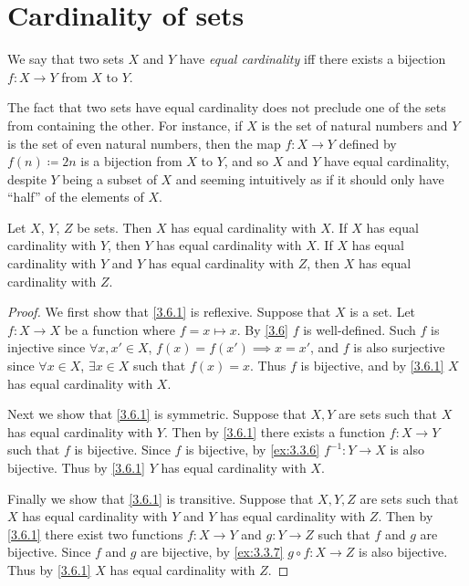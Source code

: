 \section{Cardinality of sets}\label{sec:3.6}

\begin{defn}\label{3.6.1}
  We say that two sets \(X\) and \(Y\) have \emph{equal cardinality} iff there exists a bijection \(f : X \to Y\) from \(X\) to \(Y\).
\end{defn}

\setcounter{thm}{2}
\begin{rmk}\label{3.6.3}
  The fact that two sets have equal cardinality does not preclude one of the sets from containing the other.
  For instance, if \(X\) is the set of natural numbers and \(Y\) is the set of even natural numbers, then the map \(f : X \to Y\) defined by \(f(n) \coloneqq 2n\) is a bijection from \(X\) to \(Y\), and so \(X\) and \(Y\) have equal cardinality, despite \(Y\) being a subset of \(X\) and seeming intuitively as if it should only have ``half'' of the elements of \(X\).
\end{rmk}

\begin{prop}\label{3.6.4}
  Let \(X\), \(Y\), \(Z\) be sets.
  Then \(X\) has equal cardinality with \(X\).
  If \(X\) has equal cardinality with \(Y\), then \(Y\) has equal cardinality with \(X\).
  If \(X\) has equal cardinality with \(Y\) and \(Y\) has equal cardinality with \(Z\), then \(X\) has equal cardinality with \(Z\).
\end{prop}

\begin{proof}
  We first show that \cref{3.6.1} is reflexive.
  Suppose that \(X\) is a set.
  Let \(f : X \to X\) be a function where \(f = x \mapsto x\).
  By \cref{3.6} \(f\) is well-defined.
  Such \(f\) is injective since \(\forall x, x' \in X\), \(f(x) = f(x') \implies x = x'\), and \(f\) is also surjective since \(\forall x \in X\), \(\exists x \in X\) such that \(f(x) = x\).
  Thus \(f\) is bijective, and by \cref{3.6.1} \(X\) has equal cardinality with \(X\).

  Next we show that \cref{3.6.1} is symmetric.
  Suppose that \(X, Y\) are sets such that \(X\) has equal cardinality with \(Y\).
  Then by \cref{3.6.1} there exists a function \(f : X \to Y\) such that \(f\) is bijective.
  Since \(f\) is bijective, by \cref{ex:3.3.6} \(f^{-1} : Y \to X\) is also bijective.
  Thus by \cref{3.6.1} \(Y\) has equal cardinality with \(X\).

  Finally we show that \cref{3.6.1} is transitive.
  Suppose that \(X, Y, Z\) are sets such that \(X\) has equal cardinality with \(Y\) and \(Y\) has equal cardinality with \(Z\).
  Then by \cref{3.6.1} there exist two functions \(f : X \to Y\) and \(g : Y \to Z\) such that \(f\) and \(g\) are bijective.
  Since \(f\) and \(g\) are bijective, by \cref{ex:3.3.7} \(g \circ f : X \to Z\) is also bijective.
  Thus by \cref{3.6.1} \(X\) has equal cardinality with \(Z\).
\end{proof}

